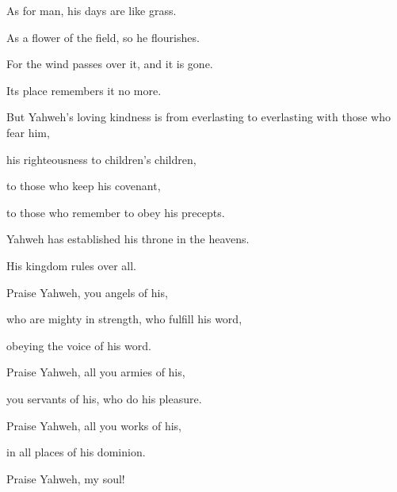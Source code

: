 {\par }{\Q {}As for man, his days are like grass.
\par }{\QB As a flower of the field, so he flourishes.
\par }{\Q {}For the wind passes over it, and it is gone.
\par }{\QB Its place remembers it no more.
\par }{\Q {}But Yahweh’s loving kindness is from everlasting to everlasting with those who fear him,
\par }{\QB his righteousness to children’s children,
\par }{\Q {}to those who keep his covenant,
\par }{\QB to those who remember to obey his precepts.
\par }{\Q {}Yahweh has established his throne in the heavens.
\par }{\QB His kingdom rules over all.
\par }{\Q {}Praise Yahweh, you angels of his,
\par }{\QB who are mighty in strength, who fulfill his word,
\par }{\QB obeying the voice of his word.
\par }{\Q {}Praise Yahweh, all you armies of his,
\par }{\QB you servants of his, who do his pleasure.
\par }{\Q {}Praise Yahweh, all you works of his,
\par }{\QB in all places of his dominion.
\par }{\QB Praise Yahweh, my soul!

}

